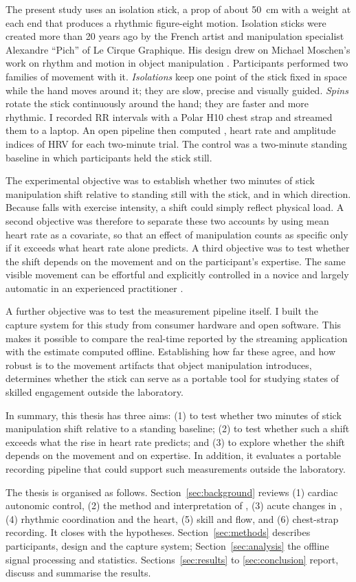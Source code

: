 The present study uses an isolation stick, a prop of about 50~cm with a weight at each end that produces a rhythmic figure-eight motion. Isolation sticks were created more than 20 years ago by the French artist and manipulation specialist Alexandre ``Pich'' of Le Cirque Graphique. His design drew on Michael Moschen's work on rhythm and motion in object manipulation . Participants performed two families of movement with it. \emph{Isolations} keep one point of the stick fixed in space while the hand moves around it; they are slow, precise and visually guided. \emph{Spins} rotate the stick continuously around the hand; they are faster and more rhythmic. I recorded RR intervals with a Polar H10 chest strap and streamed them to a laptop. An open pipeline then computed \al, heart rate and amplitude indices of HRV for each two-minute trial. The control was a two-minute standing baseline in which participants held the stick still.

The experimental objective was to establish whether two minutes of stick manipulation shift \al{} relative to standing still with the stick, and in which direction. Because \al{} falls with exercise intensity, a shift could simply reflect physical load. A second objective was therefore to separate these two accounts by using mean heart rate as a covariate, so that an effect of manipulation counts as specific only if it exceeds what heart rate alone predicts. A third objective was to test whether the shift depends on the movement and on the participant's expertise. The same visible movement can be effortful and explicitly controlled in a novice and largely automatic in an experienced practitioner \citep{fitts1967}.

A further objective was to test the measurement pipeline itself. I built the capture system for this study from consumer hardware and open software. This makes it possible to compare the real-time \al{} reported by the streaming application with the estimate computed offline. Establishing how far these agree, and how robust \al{} is to the movement artifacts that object manipulation introduces, determines whether the stick can serve as a portable tool for studying states of skilled engagement outside the laboratory.

In summary, this thesis has three aims: (1) to test whether two minutes of stick manipulation shift \al{} relative to a standing baseline; (2) to test whether such a shift exceeds what the rise in heart rate predicts; and (3) to explore whether the shift depends on the movement and on expertise. In addition, it evaluates a portable recording pipeline that could support such measurements outside the laboratory.

The thesis is organised as follows. Section~\ref{sec:background} reviews (1) cardiac autonomic control, (2) the method and interpretation of \aone, (3) acute changes in \al, (4) rhythmic coordination and the heart, (5) skill and flow, and (6) chest-strap recording. It closes with the hypotheses. Section~\ref{sec:methods} describes participants, design and the capture system; Section~\ref{sec:analysis} the offline signal processing and statistics. Sections~\ref{sec:results} to \ref{sec:conclusion} report, discuss and summarise the results.
